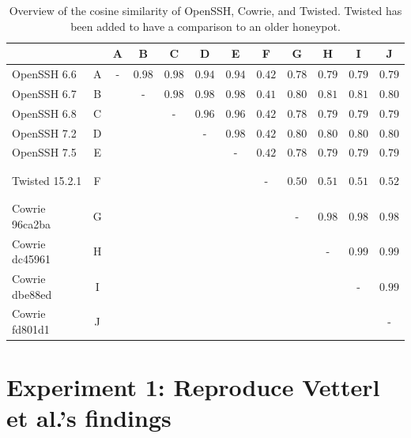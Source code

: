 \begin{table}
    \caption[Overview of the cosine similarity of OpenSSH, Cowrie, and Twisted]{
        Overview of the cosine similarity of OpenSSH, Cowrie, and Twisted.
        Twisted has been added to have a comparison to an older honeypot.
    }
    \begin{tabular}{lc|cccccccccc}
    \toprule
                   &   & A & B      & C      & D      & E      & F      & G      & H      & I      & J      \\
    \hline
    OpenSSH 6.6    & A & - & $0.98$ & $0.98$ & $0.94$ & $0.94$ & $0.42$ & $0.78$ & $0.79$ & $0.79$ & $0.79$ \\
    OpenSSH 6.7    & B &   & -      & $0.98$ & $0.98$ & $0.98$ & $0.41$ & $0.80$ & $0.81$ & $0.81$ & $0.80$ \\
    OpenSSH 6.8    & C &   &        & -      & $0.96$ & $0.96$ & $0.42$ & $0.78$ & $0.79$ & $0.79$ & $0.79$ \\
    OpenSSH 7.2    & D &   &        &        & -      & $0.98$ & $0.42$ & $0.80$ & $0.80$ & $0.80$ & $0.80$ \\
    OpenSSH 7.5    & E &   &        &        &        & -      & $0.42$ & $0.78$ & $0.79$ & $0.79$ & $0.79$ \\
    \\
    \cline{1-2} \cline{8-12}
    \\
    Twisted 15.2.1 & F &   &        &        &        &        & -      & $0.50$ & $0.51$ & $0.51$ & $0.52$ \\
    \\
    \cline{1-2} \cline{9-12}
    \\
    Cowrie 96ca2ba & G &   &        &        &        &        &        & -      & $0.98$ & $0.98$ & $0.98$ \\
    Cowrie dc45961 & H &   &        &        &        &        &        &        & -      & $0.99$ & $0.99$ \\
    Cowrie dbe88ed & I &   &        &        &        &        &        &        &        & -      & $0.99$ \\
    Cowrie fd801d1 & J &   &        &        &        &        &        &        &        &        & -      \\
    \bottomrule
    \end{tabular}
    \label{tab:cosine-similarity}
\end{table}

\section{Experiment 1: Reproduce Vetterl et al.'s findings}

